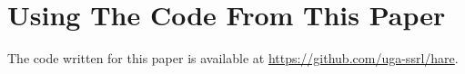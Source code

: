 \appendices
\section{Using The Code From This Paper}        %
The code written for this paper is available at
\url{https://github.com/uga-ssrl/hare}.

